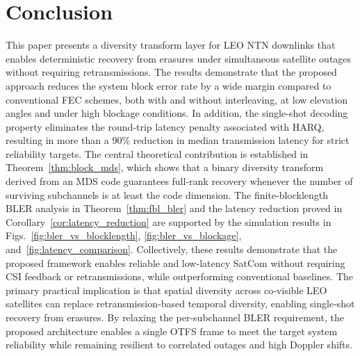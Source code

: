 \documentclass[lettersize,journal]{IEEEtran}
\begin{document}
\section{Conclusion}
\label{sec:conclusion}
This paper presents a diversity transform layer for LEO NTN downlinks  that enables deterministic recovery from erasures under simultaneous satellite  outages without requiring retransmissions. The results demonstrate that the proposed approach reduces the system block error rate by a wide margin compared to conventional FEC schemes, both with and without interleaving, at low elevation angles and under high blockage conditions. In addition, the single-shot decoding property eliminates the round-trip latency penalty associated with HARQ, resulting in more than a 90\% reduction in median transmission latency for strict reliability targets.
The central theoretical contribution is established in 
Theorem~\ref{thm:block_mds}, which shows that a binary diversity 
transform derived from an MDS code guarantees full-rank recovery 
whenever the number of surviving subchannels is at least the code 
dimension. The finite-blocklength BLER analysis in Theorem~\ref{thm:fbl_bler} and the latency reduction proved in Corollary~\ref{cor:latency_reduction} are supported by the simulation results in Figs.~\ref{fig:bler_vs_blocklength}, \ref{fig:bler_vs_blockage}, and~\ref{fig:latency_comparison}. Collectively, these results demonstrate that the proposed framework enables reliable and low-latency SatCom without requiring CSI feedback or retransmissions, while outperforming conventional baselines. The primary practical implication is that spatial diversity across co‑visible LEO satellites can replace retransmission‑based temporal diversity, enabling single‑shot recovery from erasures. By relaxing the per-subchannel BLER requirement, the proposed architecture enables a single OTFS frame to meet the target system reliability while remaining resilient to correlated outages and high Doppler shifts.

\appendices
\end{document}
